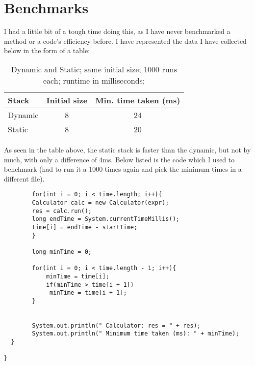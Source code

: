 \documentclass[a4paper,11pt]{article}
\begin{document}
\section*{Benchmarks}

I had a little bit of a tough time doing this, as I have never benchmarked a method or a code's efficiency before. I have represented the data I have collected below in the form of a table:

\begin{table}[h]
\begin{center}
\begin{tabular}{l|c|c}
\textbf{Stack} & \textbf{Initial size} & \textbf{Min. time taken (ms)}\\
\hline
  Dynamic     &  8 &     24\\
  Static      &  8 &     20\\
\end{tabular}
\caption{Dynamic and Static; same initial size; 1000 runs each;  runtime in milliseconds;}
\label{tab:table}
\end{center}
\end{table}

As seen in the table above, the static stack is faster than the dynamic, but not by much, with only a difference of 4ms.
Below listed is the code which I used to benchmark (had to run it a 1000 times again and pick the minimum times in a different file).

\begin{verbatim}
        for(int i = 0; i < time.length; i++){
        Calculator calc = new Calculator(expr);
        res = calc.run();
        long endTime = System.currentTimeMillis();
        time[i] = endTime - startTime;
        }

        long minTime = 0;

        for(int i = 0; i < time.length - 1; i++){
            minTime = time[i];
            if(minTime > time[i + 1])
             minTime = time[i + 1];
        }
         

        System.out.println(" Calculator: res = " + res);
        System.out.println(" Minimum time taken (ms): " + minTime);
  }
  
}
\end{verbatim}
\end{document}
